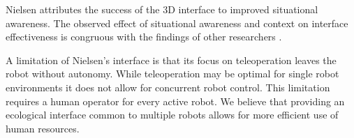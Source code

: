 Nielsen attributes the success of the 3D interface to improved situational awareness. The observed effect of situational awareness and context on interface effectiveness is congruous with the findings of other researchers \cite{Nielsen_Teleoperation}.

A limitation of Nielsen's interface is that its focus on teleoperation leaves the robot without autonomy. While teleoperation may be optimal for single robot environments it does not allow for concurrent robot control. This limitation requires a human operator for every active robot. We believe that providing an ecological interface common to multiple robots allows for more efficient use of human resources.

